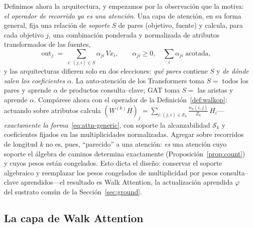 \documentclass[runningheads]{llncs}
\begin{document}
Definimos ahora la arquitectura, y empezamos por la observación que la motiva:
\emph{el operador de recorrido ya es una atención}. Una capa de atención, en su
forma general, fija una relación de \emph{soporte} $S$ de pares (objetivo,
fuente) y calcula, para cada objetivo $j$, una combinación ponderada y
normalizada de atributos transformados de las fuentes,
\begin{equation}\label{eq:attn-generic}
  \mathrm{out}_j \;=\; \sum_{i:\,(j,i)\in S}\alpha_{ji}\,Vx_i,
  \qquad \alpha_{ji}\ge0,\quad \textstyle\sum_{i}\alpha_{ji}\;\text{acotada},
\end{equation}
y las arquitecturas difieren solo en dos elecciones: \emph{qué pares} contiene
$S$ y \emph{de dónde salen los coeficientes} $\alpha$. La auto-atención de los
Transformers \cite{vaswani2017attention} toma $S=$ todos los pares y aprende
$\alpha$ de productos consulta--clave; GAT \cite{velickovic2017graph} toma $S=$
las aristas y aprende $\alpha$. Compárese ahora con el operador de la
Definición~\ref{def:walkop}: actuando sobre atributos calcula
$(W^{(k)}H)_j=\sum_{i:(j,i)\in\mathcal{S}_k}\tfrac{n_k(i,j)}{Z_k}\,H_i$---
\emph{exactamente la forma}~\eqref{eq:attn-generic}, con soporte la
alcanzabilidad $\mathcal{S}_k$ y coeficientes fijados en las multiplicidades
normalizadas. Agregar sobre recorridos de longitud $k$ no es, pues,
``parecido'' a una atención: \emph{es} una atención cuyo soporte el álgebra de
caminos determina exactamente (Proposición~\ref{prop:count}) y cuyos pesos
están congelados. Esto dicta el diseño: conservar el soporte algebraico y
reemplazar los pesos congelados de multiplicidad por pesos consulta--clave
aprendidos---el resultado es Walk Attention, la actualización aprendida
$\varphi$ del sustrato común de la Sección~\ref{sec:ground}.

\subsection{La capa de Walk Attention}\label{sec:layer}
\end{document}
